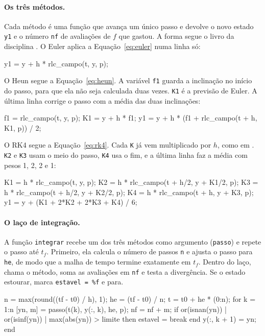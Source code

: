 \paragraph{Os três métodos.} Cada método é uma função que avança um único passo e devolve o novo estado \texttt{y1} e o número \texttt{nf} de avaliações de \(f\) que gastou. A forma segue o livro da disciplina \cite[cap.~10]{aquino2020}. O Euler aplica a Equação~\eqref{eq:euler} numa linha só:
\begin{codigo}
y1 = y + h * rlc_campo(t, y, p);
\end{codigo}
O Heun segue a Equação~\eqref{eq:heun}. A variável \texttt{f1} guarda a inclinação no início do passo, para que ela não seja calculada duas vezes. \texttt{K1} é a previsão de Euler. A última linha corrige o passo com a média das duas inclinações:
\begin{codigo}
f1 = rlc_campo(t, y, p);
K1 = y + h * f1;
y1 = y + h * (f1 + rlc_campo(t + h, K1, p)) / 2;
\end{codigo}
O RK4 segue a Equação~\eqref{eq:rk4}. Cada \texttt{K} já vem multiplicado por \(h\), como em \textcite[seção~10.3.2]{aquino2020}. \texttt{K2} e \texttt{K3} usam o meio do passo, \texttt{K4} usa o fim, e a última linha faz a média com pesos 1, 2, 2 e 1:
\begin{codigo}
K1 = h * rlc_campo(t, y, p);
K2 = h * rlc_campo(t + h/2, y + K1/2, p);
K3 = h * rlc_campo(t + h/2, y + K2/2, p);
K4 = h * rlc_campo(t + h, y + K3, p);
y1 = y + (K1 + 2*K2 + 2*K3 + K4) / 6;
\end{codigo}

\paragraph{O laço de integração.} A função \texttt{integrar} recebe um dos três métodos como argumento (\texttt{passo}) e repete o passo até \(t_f\). Primeiro, ela calcula o número de passos \texttt{n} e ajusta o passo para \texttt{he}, de modo que a malha de tempo termine exatamente em \(t_f\). Dentro do laço, chama o método, soma as avaliações em \texttt{nf} e testa a divergência. Se o estado estourar, marca \texttt{estavel = \%f} e para.
\begin{codigo}
n = max(round((tf - t0) / h), 1);
he = (tf - t0) / n;
t = t0 + he * (0:n);
for k = 1:n
    [yn, m] = passo(t(k), y(:, k), he, p);
    nf = nf + m;
    if or(isnan(yn)) | or(isinf(yn)) | max(abs(yn)) > limite then
        estavel = %
        break
    end
    y(:, k + 1) = yn;
end
\end{codigo}

